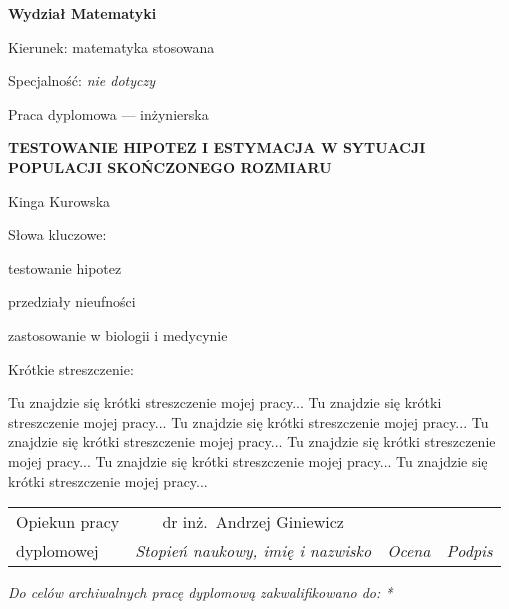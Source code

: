 \documentclass[12pt,a4paper,twoside]{book}
\begin{document}
\begin{titlepage}
\noindent\textbf{\large Wydział Matematyki}
\par\medskip\noindent
Kierunek: matematyka stosowana
\par\noindent
Specjalność: \textit{nie dotyczy}
\vspace*{36pt}
\begin{center}
\LARGE Praca dyplomowa --- inżynierska
\end{center}
\vspace*{24pt}
\begin{center}
\uppercase{\Large\bfseries%
Testowanie hipotez i estymacja w sytuacji populacji sko\'nczonego rozmiaru}
\end{center}
\vspace*{12pt}
\begin{center}
Kinga Kurowska
\end{center}
\vspace*{12pt}
\begin{flushright}
Słowa kluczowe:\par\noindent
testowanie hipotez\par\noindent
przedziały nieufności\par\noindent
zastosowanie w biologii i medycynie\par\noindent
\end{flushright}
\begin{flushleft}
Krótkie streszczenie:\par
Tu znajdzie się krótki streszczenie mojej pracy... Tu znajdzie się krótki streszczenie mojej pracy... Tu znajdzie się krótki streszczenie mojej pracy... Tu znajdzie się krótki streszczenie mojej pracy... Tu znajdzie się krótki streszczenie mojej pracy... Tu znajdzie się krótki streszczenie mojej pracy... Tu znajdzie się krótki streszczenie mojej pracy...
\smallskip
\end{flushleft}
\begin{tabularx}{\textwidth}{|l|c|X|X|}
\hline
{\footnotesize Opiekun pracy} & {\small dr inż.\ Andrzej Giniewicz} &  &  \\
\cline{2-4}
{\footnotesize dyplomowej} & \textit{\footnotesize Stopień naukowy, imię i nazwisko} & \textit{\footnotesize Ocena} & \textit{\footnotesize Podpis} \\
\hline
\end{tabularx}
\smallskip
\begin{flushleft}
\small\itshape
Do celów archiwalnych pracę dyplomową zakwalifikowano do: *

\end{flushleft}
\end{titlepage}
\end{document}
